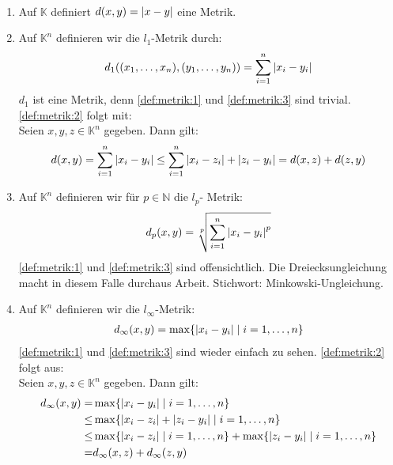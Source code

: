 \begin{Beispiel}{
	~
	\begin{enumerate}
		\item Auf $\mathbb{K}$ definiert $d(x,y) = \abs{x -y}$ eine Metrik.
		\item Auf $\mathbb{K}^n$ definieren wir die $l_1$-Metrik durch:
		\begin{align*}
			d_1( (x_1, \hdots, x_n), (y_1, \hdots, y_n) ) =
			 \sum_{i = 1}^n \abs{x_i - y_i}
		\end{align*}
		$d_1$ ist eine Metrik, denn \ref{def:metrik:1} und \ref{def:metrik:3} sind 
		 trivial. \ref{def:metrik:2} folgt mit: \\
		 Seien $ x, y, z \in \mathbb{K}^n $ gegeben. Dann gilt:
		 \begin{align*}
		 	d(x,y) = \sum_{i = 1}^n \abs{x_i - y_i} \leq 
		 	\sum_{i = 1}^n \abs{x_i-z_i} + \abs{z_i - y_i} = d(x,z) + d(z,y)
		 \end{align*}
		 \item Auf $\mathbb{K}^n$ definieren wir für $p \in \mathbb{N}$ die $l_p$-
		 Metrik:
		 \begin{align*}
		 	d_p (x,y) = \sqrt[p]{\sum_{i=1}^n\abs{x_i-y_i}^p}
		 \end{align*}
		 \ref{def:metrik:1} und \ref{def:metrik:3} sind offensichtlich. Die 
		 Dreiecksungleichung macht in diesem Falle durchaus Arbeit. 
		 Stichwort: Minkowski-Ungleichung.
	 \item \label{vl_19_stp_4} Auf $\mathbb{K}^n$ definieren wir die $l_{\infty}$-Metrik:
		 \begin{align*}
		 	d_{\infty} (x,y) = \max\{\abs{x_i-y_i}\mid i = 1, \hdots, n\}
		 \end{align*}
		 \ref{def:metrik:1} und \ref{def:metrik:3} sind wieder einfach zu sehen. 
		 \ref{def:metrik:2} folgt aus: \\
		 Seien $x,y,z \in \mathbb{K}^n$ gegeben. Dann gilt:
		 \begin{align*}
		 	d_{\infty} (x,y) = & \max\{\abs{x_i-y_i} \mid  i = 1, \hdots, n\} \\
		 	\leq & \max\{\abs{x_i - z_i} + \abs{z_i - y_i} \mid i = 1, \hdots, n\} \\
		 	\leq & \max\{\abs{x_i-z_i} \mid i = 1, \hdots, n\} + 
		 	\max\{\abs{z_i - y_i}\mid i = 1, \hdots, n\}  \\
		 	= & d_{\infty}(x,z) + d_{\infty} (z,y)
		 \end{align*}
	\end{enumerate}
}\end{Beispiel}


